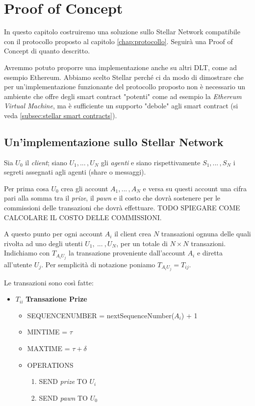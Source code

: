 \chapter{Proof of Concept}

In questo capitolo costruiremo una soluzione sullo Stellar Network
compatibile con il protocollo proposto al capitolo \ref{chap:protocollo}.
Seguirà una Proof of Concept di quanto descritto.

Avremmo potuto proporre una
implementazione anche su altri DLT, come ad esempio Ethereum. Abbiamo scelto
Stellar perché ci da modo di dimostrare che per un'implementazione funzionante
del protocollo proposto non è necessario un ambiente che
offre degli smart contract "potenti" come ad esempio
la \textit{Ethereum Virtual Machine},
ma è sufficiente un supporto
"debole" agli smart contract (si veda \ref{subsec:stellar smart contracts}).


\section{Un'implementazione sullo Stellar Network}
Sia $ U_0 $ il \textit{client};
siano $ U_1, ...\, , U_N $ gli \textit{agenti} e
siano rispettivamente $ S_1, ...\, , S_N $ i segreti assegnati agli agenti
(share o messaggi).

Per prima cosa $ U_0 $ crea gli account $ A_1, ...\, , A_N $ e
versa su questi account una cifra pari alla somma tra
il \textit{prize}, il \textit{pawn} e il costo che dovrà sostenere per le commissioni
delle transazioni che dovrà effettuare.
TODO SPIEGARE COME CALCOLARE IL COSTO DELLE COMMISSIONI.

A questo punto per ogni account $ A_i $ il client crea $ N $ transazioni
ognuna delle quali rivolta ad uno degli utenti $ U_1,\ ...\ , U_N $, per un totale
di $ N \times N $ transazioni. Indichiamo con $ T_{{A_i}{U_j}} $ la transazione
proveniente dall'account $ A_i $ e diretta all'utente $ U_j $.
Per semplicità di notazione poniamo $ T_{{A_i}{U_j}} = T_{ij} $.

Le transazioni sono così fatte:
\begin{itemize}
	\item $T_{ii} $ \textbf{Transazione Prize}
	      \begin{itemize}
		      \item SEQUENCE\textunderscore NUMBER = nextSequenceNumber($ A_i $) + 1
		      \item MIN\textunderscore TIME = $ \tau $
		      \item MAX\textunderscore TIME = $ \tau + \delta $
		      \item OPERATIONS
		            \begin{enumerate}
			            \item SEND \textit{prize} TO $ U_i $
			            \item SEND \textit{pawn} TO $ U_0 $
		            \end{enumerate}
	      \end{itemize}
\end{itemize}

